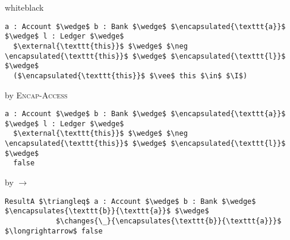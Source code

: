 \documentclass[acmsmall,review,anonymous]{acmart}\settopmatter{printfolios=true,printccs=false,printacmref=false}
\begin{document}
\begin{proofBox}{white}{black}
\begin{minipage}{0.75\textwidth}
\begin{lstlisting}[language = Chainmail, mathescape=true]
a : Account $\wedge$ b : Bank $\wedge$ $\encapsulated{\texttt{a}}$ $\wedge$ l : Ledger $\wedge$
  $\external{\texttt{this}}$ $\wedge$ $\neg \encapsulated{\texttt{this}}$ $\wedge$ $\encapsulated{\texttt{l}}$ $\wedge$
  ($\encapsulated{\texttt{this}}$ $\vee$ this $\in$ $\I$)
\end{lstlisting}
\end{minipage}
\begin{minipage}{0.24\textwidth}
\scriptsize
\hfill by \textsc{Encap-Access}
\end{minipage}
\begin{minipage}{0.75\textwidth}
\begin{lstlisting}[language = Chainmail, mathescape=true]
a : Account $\wedge$ b : Bank $\wedge$ $\encapsulated{\texttt{a}}$ $\wedge$ l : Ledger $\wedge$
  $\external{\texttt{this}}$ $\wedge$ $\neg \encapsulated{\texttt{this}}$ $\wedge$ $\encapsulated{\texttt{l}}$ $\wedge$
  false
\end{lstlisting}
\end{minipage}
\begin{minipage}{0.24\textwidth}
\scriptsize
\hfill by $\longrightarrow$
\end{minipage}
\begin{minipage}{0.75\textwidth}
\begin{lstlisting}[language = Chainmail, mathescape=true, frame=none]
ResultA $\triangleq$ a : Account $\wedge$ b : Bank $\wedge$ $\encapsulates{\texttt{b}}{\texttt{a}}$ $\wedge$ 
            $\changes{\_}{\encapsulates{\texttt{b}}{\texttt{a}}}$ $\longrightarrow$ false
\end{lstlisting}
\end{minipage}
\begin{minipage}{0.24\textwidth}
\end{minipage}
\end{proofBox}
\end{document}
